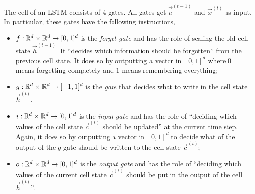 The cell of an LSTM consists of 4 gates. All gates get $\vec{h}^{(t-1)}$ and $\vec{x}^{(t)}$ as
input. In particular, these gates have the following instructions,
\begin{itemize}
    \item $f: \mathbb{R}^d \times \mathbb{R}^d \to [0,1]^d$ is the \textit{forget gate} and has the role of scaling
          the old cell state $\vec{h}^{(t-1)}$. It ``decides which information should be forgotten''
          from the previous cell state. It does so by outputting a vector in $[0,1]^d$ where $0$ means
          forgetting completely and $1$ means remembering everything;

    \item $g: \mathbb{R}^d \times \mathbb{R}^d \to [-1, 1]^d$ is the \textit{gate} that decides what to write in the
          cell state $\vec{h}^{(t)}$.

    \item $i: \mathbb{R}^d \times \mathbb{R}^d \to [0,1]^d$ is the \textit{input gate} and has the role of ``deciding
          which values of the cell state $\vec{c}^{(t)}$ should be updated'' at the current time step.
          Again, it does so by outputting a vector in $[0,1]^d$ to decide what of the output of the $g$
          gate should be written to the cell state $\vec{c}^{(t)}$;

    \item $o: \mathbb{R}^d \times \mathbb{R}^d \to [0,1]^d$ is the \textit{output gate} and has the role of
          ``deciding which values of the current cell state $\vec{c}^{(t)}$ should be put in the output
          of the cell $\vec{h}^{(t)}$''.
\end{itemize}

